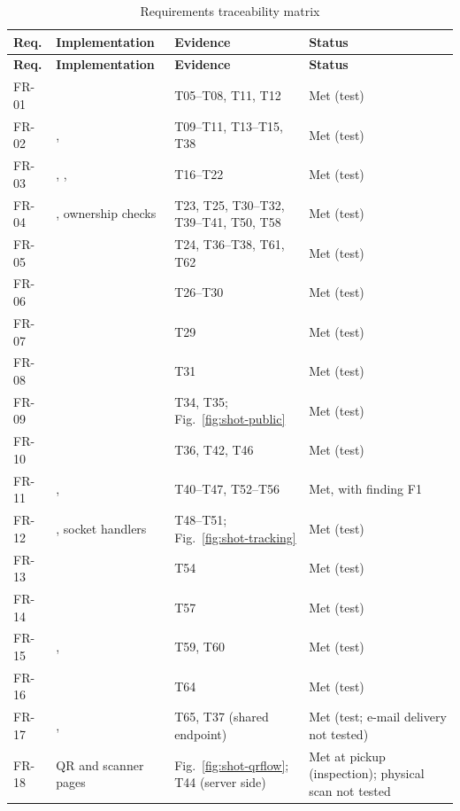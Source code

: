 \begin{longtable}{@{}P{1.9cm}P{4.3cm}P{3.8cm}P{3.6cm}@{}}
\caption{Requirements traceability matrix}\label{tab:trace}\\
\toprule
\textbf{Req.} & \textbf{Implementation} & \textbf{Evidence} & \textbf{Status} \\
\midrule
\endfirsthead
\toprule
\textbf{Req.} & \textbf{Implementation} & \textbf{Evidence} & \textbf{Status} \\
\midrule
\endhead
FR-01 &  & T05--T08, T11, T12 & Met (test) \\
FR-02 & ,  & T09--T11, T13--T15, T38 & Met (test) \\
FR-03 & , ,  & T16--T22 & Met (test) \\
FR-04 & , ownership checks & T23, T25, T30--T32, T39--T41, T50, T58 & Met (test) \\
FR-05 &  & T24, T36--T38, T61, T62 & Met (test) \\
FR-06 &  & T26--T30 & Met (test) \\
FR-07 &  & T29 & Met (test) \\
FR-08 &  & T31 & Met (test) \\
FR-09 &  & T34, T35; Fig.~\ref{fig:shot-public} & Met (test) \\
FR-10 &  & T36, T42, T46 & Met (test) \\
FR-11 & ,  & T40--T47, T52--T56 & Met, with finding F1 \\
FR-12 & , socket handlers & T48--T51; Fig.~\ref{fig:shot-tracking} & Met (test) \\
FR-13 &  & T54 & Met (test) \\
FR-14 &  & T57 & Met (test) \\
FR-15 & ,  & T59, T60 & Met (test) \\
FR-16 &  & T64 & Met (test) \\
FR-17 & ,  & T65, T37 (shared endpoint) & Met (test; e-mail delivery not tested) \\
FR-18 & QR and scanner pages & Fig.~\ref{fig:shot-qrflow}; T44 (server side) & Met at pickup (inspection); physical scan not tested \\

\end{longtable}

